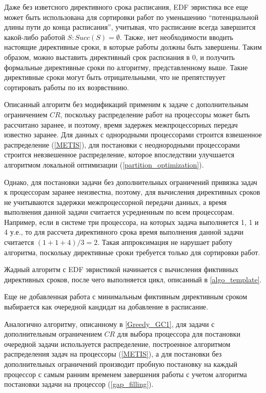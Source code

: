 Даже без изветсного директивного срока расписания, EDF эвристика все еще может быть использована для сортировки работ по уменьшению ``потенциальной длины пути  до конца расписания'', учитывая, что расписание всегда завершится какой-либо работой $S : Succ(S) = \emptyset$. Также, нет необходимости вводить настоящие директивные сроки, в которые работы должны быть завершены. Таким образом, можно выставить директивный срок распсиания в $0$, и получить формальные директивные сроки по алгоритму, представленному выше. Такие директивные сроки могут быть отрицательными, что не препятствуует сортировать работы по их возрвствнию.

Описанный алгоритм без модификаций применим к задаче с дополнительным ограничением $CR$, поскольку распределение работ на процессоры может быть рассчитано заранее, и поэтому, время задержек межпроцессорных передач известно заранее. Для данных с однородными процессорами строится взвешенное распределение (\ref{METIS}), для постановки с неоднородными процессорами строится невзвешенное распределение, которое впоследствии улучшается алгоритмом локальной оптимизации (\ref{partition_optimization}). 

Однако, для постановки задачи без дополнительных ограничений привязка задач к процессорам заранее неизвестна, поэтому, для вычисления директивных сроков не учитываются задержки межпроцессорной передачи данных, а время выполнения данной задачи считается усредненным по всем процессорам. Например, если в системе три процессора, на которых задача выполняется 1, 1 и 4 у.е., то для рассчета директивного срока время выполнения данной задачи считается $(1+1+4)/3 = 2$. Такая аппроксимация не нарушает работу алгоритма, поскольку директивные сроки требуется только для сортировки работ.

Жадный алгоритм с EDF эвристикой начинается с вычисления фиктивных директивных сроков, после чего выполняется цикл, описанный в \ref{algo_template}.

Еще не добавленная работа с минимальным фиктивным директивным сроком выбирается как очередной кандидат на добавление в расписание. 

Аналогично алгоритму, описанному в \ref{Greedy_GC1}, для задачи с дополнительным ограничением $CR$ для выбора процессора для постановки очередной задачи используется распределение, построенное алгоритмом распределения задач на процессоры (\ref{METIS}), а для постановки без дополнительных ограничений производит пробную постановку на каждый процессор с самым ранним временем завершения работы с учетом алгоритма постановки задачи на процессор (\ref{gap_filling}).

